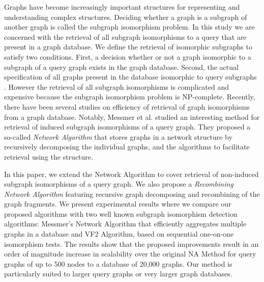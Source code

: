 Graphs have become increasingly important structures for representing and understanding complex structures.
Deciding whether a graph is a subgraph of another graph is called the subgraph isomorphism problem. 
In this study we are concerned with the retrieval of all subgraph isomorphisms to a query that are present in a graph database.
We define the retrieval of isomorphic subgraphs to satisfy two conditions. 
 First, a decision whether or not a graph isomorphic to a subgraph of a query graph exists in the graph database.
Second, the actual specification of all graphs present in the database isomorphic to query subgraphs . 
However the retrieval of all subgraph isomorphisms is complicated and expensive because the subgraph isomorphism problem is NP-complete.
Recently, there have been several studies on efficiency of retrieval of graph isomorphisms from a graph database.
Notably, Messmer et al. studied an interesting method for retrieval of induced subgraph isomorphisms of a query graph.
They proposed a so-called \textit{Network Algorithm} that stores graphs  in a network structure  by recursively decomposing the individual graphs, and the algorithms to facilitate retrieval using the structure.

In this paper, we extend the Network Algorithm to cover retrieval of non-induced subgraph isomorphisms of a query graph. We also propose a  \textit{Recombining  Network Algorithm} featuring recursive graph decomposing and recombining of the graph fragments. 
We present experimental results where we compare our proposed algorithms with two well known subgraph isomorphism detection algorithms: Messmer's Network Algorithm that efficiently aggregates multiple graphs in a database
 and VF2 Algorithm, based on sequential one-on-one isomorphism tests. 
The results show that the proposed improvements result in an order of magnitude increase in scalability over the original  NA Method  for query graphs of up to 500 nodes to a database of 20,000 graphs.  
Our method is particularly suited to larger query graphs or very larger graph databases.

